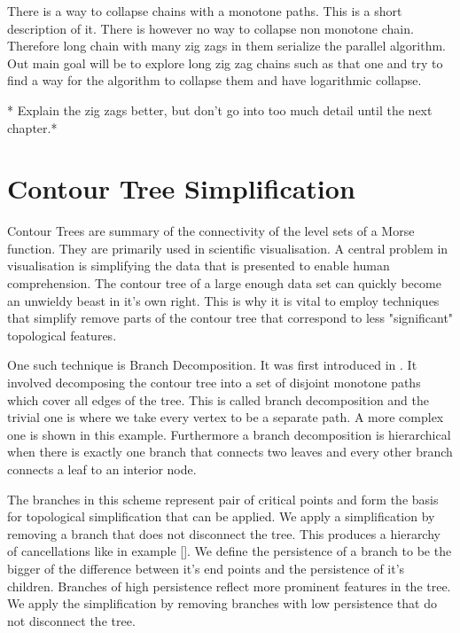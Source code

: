 There is a way to collapse chains with a monotone paths. This is a short description of it. There is however no way to collapse non monotone chain. Therefore long chain with many zig zags in them serialize the parallel algorithm. Out main goal will be to explore long zig zag chains such as that one and try to find a way for the algorithm to collapse them and have logarithmic collapse.

* Explain the zig zags better, but don't go into too much detail until the next chapter.*

\section{Contour Tree Simplification}

Contour Trees are summary of the connectivity of the level sets of a Morse function. They are primarily used in scientific visualisation. A central problem in visualisation is simplifying the data that is presented to enable human comprehension. The contour tree of a large enough data set can quickly become an unwieldy beast in it's own right. This is why it is vital to employ techniques that simplify remove parts of the contour tree that correspond to less "significant" topological features.

One such technique is Branch Decomposition. It was first introduced in \cite{ct-branch-decomp}. It involved decomposing the contour tree into a set of disjoint monotone paths which cover all edges of the tree. This is called branch decomposition and the trivial one is where we take every vertex to be a separate path. A more complex one is shown in this example. Furthermore a branch decomposition is hierarchical when there is exactly one branch that connects two leaves and every other branch connects a leaf to an interior node.

The branches in this scheme represent pair of critical points and form the basis for topological simplification that can be applied. We apply a simplification by removing a branch that does not disconnect the tree. This produces a hierarchy of cancellations like in example []. We define the persistence of a branch to be the bigger of the difference between it's end points and the persistence of it's children. Branches of high persistence reflect more prominent features in the tree. We apply the simplification by removing branches with low persistence that do not disconnect the tree.

